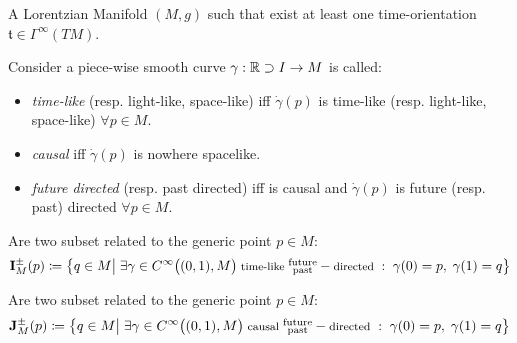 \documentclass[a4paper,12pt]{scrartcl}    %
\begin{document}
	\begin{definition}
		A Lorentzian Manifold $(M,g)$ such that exist at least one time-orientation $\mathfrak{t}\in \Gamma^\infty(TM)$.
	\end{definition}

	\begin{notationfix}
		Consider a piece-wise smooth curve $\gamma: \mathbb{R}\supset I \rightarrow M$ is called:
		\begin{itemize}
			\item \emph{time-like} (resp. light-like, space-like) iff $\dot{\gamma}(p)$ is time-like (resp. light-like, space-like) $\forall p \in M$.
			\item \emph{causal} iff $\dot{\gamma}(p)$ is nowhere spacelike.
			\item \emph{future directed} (resp. past directed) iff is causal and  $\dot{\gamma}(p)$ is future (resp. past) directed $\forall p \in M$.
		\end{itemize}
	\end{notationfix}

	\begin{definition}
		Are two subset related to the generic point $p	\in M$:
		\begin{displaymath}
			\mathbf{I}_M^\pm(p) \coloneqq \big\{ q \in M \big\vert \; \exists \gamma \in C^\infty\big((0,1), M\big)\;  \textrm{\footnotesize time-like } \substack{\textrm{future}\\ \textrm{past} } -\textrm{\footnotesize directed }:\; \gamma(0)=p,\; \gamma(1)=q  \big\}
		\end{displaymath}
	\end{definition}
	
	\begin{definition}
		Are two subset related to the generic point $p	\in M$:
		\begin{displaymath}
			\mathbf{J}_M^\pm(p) \coloneqq \big\{ q \in M \big\vert \; \exists \gamma \in C^\infty\big((0,1), M\big)\; \textrm{\footnotesize causal } \substack{\textrm{future}\\ \textrm{past} } -\textrm{\footnotesize directed }:\; \gamma(0)=p,\; \gamma(1)=q  \big\}
		\end{displaymath}		
	\end{definition}
\end{document}
